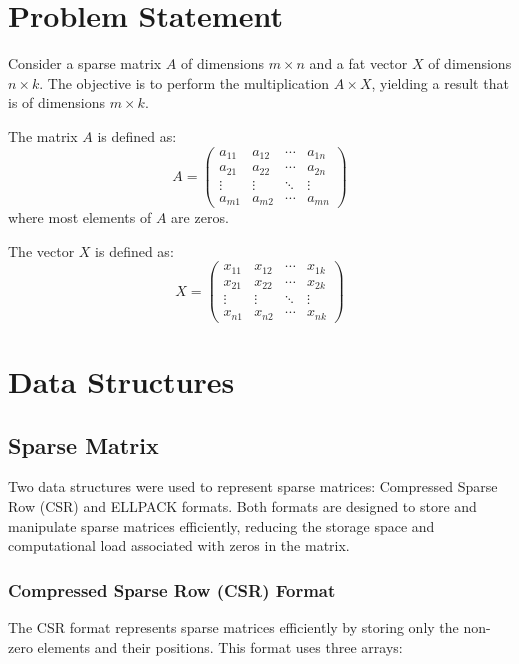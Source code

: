 \documentclass[12pt,oneside]{book} %
\begin{document}
\section{Problem Statement}
Consider a sparse matrix $A$ of dimensions $m \times n$ and a fat vector $X$ of
dimensions $n \times k$. The objective is to perform the multiplication $A
    \times X$, yielding a result that is of dimensions $m \times k$.

The matrix $A$ is defined as:
\begin{equation}
    A = \begin{pmatrix}
        a_{11} & a_{12} & \cdots & a_{1n} \\
        a_{21} & a_{22} & \cdots & a_{2n} \\
        \vdots & \vdots & \ddots & \vdots \\
        a_{m1} & a_{m2} & \cdots & a_{mn}
    \end{pmatrix}
\end{equation}\label{eq:sparse-matrix}
where most elements of $A$ are zeros.

The vector $X$ is defined as:
\begin{equation}
    X = \begin{pmatrix}
        x_{11} & x_{12} & \cdots & x_{1k} \\
        x_{21} & x_{22} & \cdots & x_{2k} \\
        \vdots & \vdots & \ddots & \vdots \\
        x_{n1} & x_{n2} & \cdots & x_{nk}
    \end{pmatrix}\label{eq:fat-vector}
\end{equation}

\section{Data Structures}

\subsection{Sparse Matrix}
Two data structures were used to represent sparse matrices: Compressed Sparse
Row (CSR) and ELLPACK formats. Both formats are designed to store and
manipulate sparse matrices efficiently, reducing the storage space and
computational load associated with zeros in the matrix.

\subsubsection{Compressed Sparse Row (CSR) Format}
The CSR format represents sparse matrices efficiently by storing only the
non-zero elements and their positions. This format uses three arrays:
\end{document}
